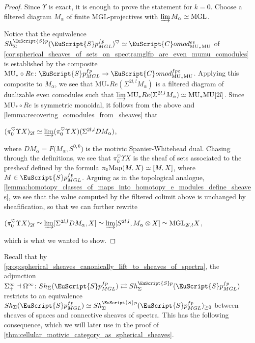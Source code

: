 \documentclass[oneside,a4paper]{amsart}
\newcommand{\euscr}[1]{\EuScript{#1}} %
\newcommand{\Map}{\textnormal{Map}} %
\newcommand{\MU}{\mathrm{MU}} %
\newcommand{\MGL}{\mathrm{MGL}} %
\newcommand{\spectra}{\euscr{S}p} %
\newcommand{\spectramglfp}{\spectra_{MGL}^{fp}} %
\newcommand{\Comod}{\euscr{C}omod} %
\newcommand{\ComodMU}{\Comod_{\MU_{*}\MU}} %
\theoremstyle{plain}
\theoremstyle{definition}
\theoremstyle{remark}
\begin{document}
\begin{proof}
Since $\Upsilon$ is exact, it is enough to prove the statement for $k = 0$. Choose a filtered diagram $M_{\alpha}$ of finite $\MGL$-projectives with  $\varinjlim M_{\alpha} \simeq \MGL$. 

Notice that the equivalence $Sh_{\Sigma}^{\spectra}(\spectramglfp)^{\heartsuit} \simeq \ComodMU^{ev}$ of \cref{cor:spherical_sheaves_of_sets_on_spectramglfp_are_even_mumu_comodules} 
is established by the composite $\MU_{*} \circ Re \colon \spectramglfp \rightarrow \ComodMU^{fpe}$. Applying this composite to $M_{\alpha}$, we see that $\MU_{*} Re(\Sigma^{2l, l} M_{\alpha})$ is a filtered diagram of dualizable even comodules such that $\varinjlim \MU_{*} Re(\Sigma^{2l, l} M_{\alpha}) \simeq \MU_{*}\MU[2l]$. Since $\MU_{*} \circ Re$ is symmetric monoidal, it follows from the above and \cref{lemma:recovering_comodules_from_sheaves} that

\begin{center}
$(\pi_{0}^{\heartsuit}\Upsilon X )_{2l} \simeq \varinjlim (\pi_{0}^{\heartsuit} \Upsilon X)(\Sigma^{2l, l} DM_{\alpha})$,
\end{center}
where $DM_{\alpha} = F(M_{\alpha}, S^{0, 0}$) is the motivic Spanier-Whitehead dual. Chasing through the definitions, we see that $\pi_{0}^{\heartsuit} \Upsilon X$ is the sheaf of sets associated to the presheaf defined by the formula $\pi_{0} \Map(M, X) \simeq [M, X]$, where $M \in \spectramglfp$. Arguing as in the topological analogue, \cref{lemma:homotopy_classes_of_maps_into_homotopy_e_modules_define_sheaves}, we see that the value computed by the filtered colimit above is unchanged by sheafification, so that we can further rewrite 

\begin{center}
$(\pi_{0}^{\heartsuit}\Upsilon X )_{2l}  \simeq \varinjlim [\Sigma^{2l, l} D M_{\alpha}, X] \simeq \varinjlim [S^{2l, l}, M_{\alpha} \otimes X] \simeq \MGL_{2l, l} X$,
\end{center}
which is what we wanted to show. 
\end{proof}

Recall that by \cref{prop:spherical_sheaves_canonically_lift_to_sheaves_of_spectra}, the adjunction $\Sigma^{\infty}_{+} \dashv \Omega^{\infty} \colon  Sh_{\Sigma}(\spectramglfp) \rightleftarrows Sh_{\Sigma}^{\spectra}(\spectramglfp)$ restricts to an equivalence $Sh_{\Sigma}(\spectramglfp) \simeq Sh_{\Sigma}^{\spectra}(\spectramglfp)_{\geq 0}$ between sheaves of spaces and connective sheaves of spectra. This has the following consequence, which we will later use in the proof of \cref{thm:cellular_motivic_category_as_spherical_sheaves}.
\end{document}
